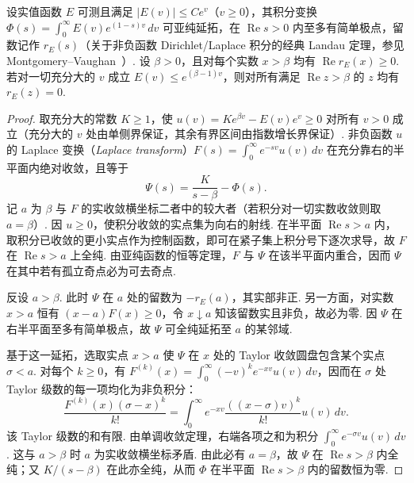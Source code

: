 \begin{lemma}
\label{lem:landau}
\emitthmsource
设实值函数 $E$ 可测且满足 $|E(v)|\le C e^v$（$v\ge0$），其积分变换 $\Phi(s)=\int_0^\infty E(v)e^{(1-s)v}\,dv$ 可亚纯延拓，在 $\operatorname{Re}s>0$ 内至多有简单极点，留数记作 $r_E(s)$（关于非负函数 Dirichlet/Laplace 积分的经典 Landau 定理，参见 Montgomery--Vaughan~\cite{MontgomeryVaughan2007}）. 设 $\beta>0$，且对每个实数 $x>\beta$ 均有 $\operatorname{Re}r_E(x)\ge0$. 若对一切充分大的 $v$ 成立 $E(v)\le e^{(\beta-1)v}$，则对所有满足 $\operatorname{Re}z>\beta$ 的 $z$ 均有 $r_E(z)=0$.
\end{lemma}
\begin{proof}
取充分大的常数 $K\ge1$，使 $u(v)=Ke^{\beta v}-E(v)e^v\ge0$ 对所有 $v>0$ 成立（充分大的 $v$ 处由单侧界保证，其余有界区间由指数增长界保证）. 非负函数 $u$ 的 Laplace 变换（\emph{Laplace transform}）$F(s)=\int_0^\infty e^{-sv}u(v)\,dv$ 在充分靠右的半平面内绝对收敛，且等于
\[
 \Psi(s)=\frac K{s-\beta}-\Phi(s).
\]
记 $a$ 为 $\beta$ 与 $F$ 的实收敛横坐标二者中的较大者（若积分对一切实数收敛则取 $a=\beta$）. 因 $u\ge0$，使积分收敛的实点集为向右的射线. 在半平面 $\operatorname{Re}s>a$ 内，取积分已收敛的更小实点作为控制函数，即可在紧子集上积分号下逐次求导，故 $F$ 在 $\operatorname{Re}s>a$ 上全纯. 由亚纯函数的恒等定理，$F$ 与 $\Psi$ 在该半平面内重合，因而 $\Psi$ 在其中若有孤立奇点必为可去奇点.

反设 $a>\beta$. 此时 $\Psi$ 在 $a$ 处的留数为 $-r_E(a)$，其实部非正. 另一方面，对实数 $x>a$ 恒有 $(x-a)F(x)\ge0$，令 $x\downarrow a$ 知该留数实且非负，故必为零. 因 $\Psi$ 在右半平面至多有简单极点，故 $\Psi$ 可全纯延拓至 $a$ 的某邻域.

基于这一延拓，选取实点 $x>a$ 使 $\Psi$ 在 $x$ 处的 Taylor 收敛圆盘包含某个实点 $\sigma<a$. 对每个 $k\ge0$，有 $F^{(k)}(x)=\int_0^\infty(-v)^k e^{-xv}u(v)\,dv$，因而在 $\sigma$ 处 Taylor 级数的每一项均化为非负积分：
\[
 \frac{F^{(k)}(x)(\sigma-x)^k}{k!}
   =\int_0^\infty e^{-xv}\frac{((x-\sigma)v)^k}{k!}u(v)\,dv.
\]
该 Taylor 级数的和有限. 由单调收敛定理，右端各项之和为积分 $\int_0^\infty e^{-\sigma v}u(v)\,dv$. 这与 $a>\beta$ 时 $a$ 为实收敛横坐标矛盾. 由此必有 $a=\beta$，故 $\Psi$ 在 $\operatorname{Re}s>\beta$ 内全纯；又 $K/(s-\beta)$ 在此亦全纯，从而 $\Phi$ 在半平面 $\operatorname{Re}s>\beta$ 内的留数恒为零.
\end{proof}

